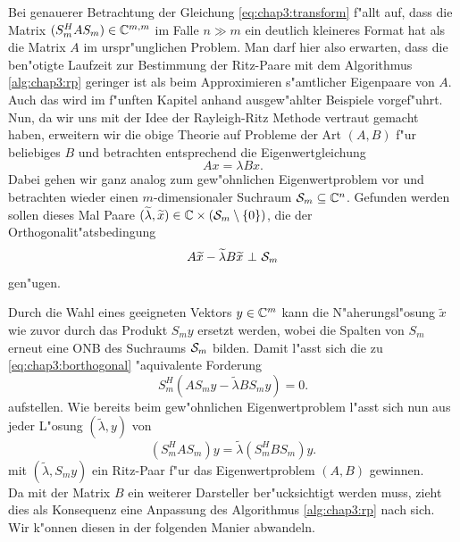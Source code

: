 Bei
genauerer Betrachtung der Gleichung \eqref{eq:chap3:transform} f"allt auf, dass die
Matrix $(S_m^H A S_m) \in \C^{m,m}$ im Falle $n \gg m$ ein deutlich kleineres
Format hat als die Matrix $A$ im urspr"unglichen Problem. Man darf hier also erwarten,
dass die ben"otigte Laufzeit zur Bestimmung der Ritz-Paare mit dem Algorithmus \ref{alg:chap3:rp}
geringer ist als beim Approximieren s"amtlicher Eigenpaare von $A$. Auch das
wird im f"unften Kapitel anhand ausgew"ahlter Beispiele vorgef"uhrt.\\

Nun, da wir uns mit der Idee der Rayleigh-Ritz Methode vertraut gemacht haben, erweitern wir die obige Theorie auf Probleme der Art $(A,B)$ f"ur beliebiges $B$ und betrachten entsprechend die Eigenwertgleichung
\begin{equation}\label{eq:chap3:gevp}
Ax = \lambda Bx.
\end{equation}
Dabei gehen wir ganz analog zum gew"ohnlichen Eigenwertproblem vor und betrachten wieder
einen $m$-dimensionaler Suchraum $\S_m\subseteq \Cn$.
Gefunden werden sollen dieses Mal Paare $ (\widetilde{\lambda}, \widetilde{x}) \in \C
\times (\S_m \setminus\{ 0\})$, die der Orthogonalit"atsbedingung
\begin{equation}\label{eq:chap3:borthogonal}
A\widetilde{x} - \widetilde{\lambda}B\widetilde{x} \ \bot \ \S_m
\end{equation}
gen"ugen.

\newpage

Durch die Wahl eines geeigneten Vektors $y\in\C^m$ kann die N"aherungsl"osung $\widetilde{x}$ wie zuvor durch das Produkt $S_m y$ ersetzt werden, wobei die Spalten von $S_m$ erneut eine ONB des Suchraums $\S_m$ bilden.
Damit l"asst sich die zu \eqref{eq:chap3:borthogonal} "aquivalente Forderung
\[
S_m^H(AS_m y - \widetilde{\lambda} BS_m y) = 0.
\]
aufstellen. Wie bereits beim gew"ohnlichen Eigenwertproblem l"asst sich nun aus jeder L"osung
$(\widetilde{\lambda}, y)$ von
\begin{equation}\label{eq:chap3:transformedevp}
(S_m^H AS_m) y = \widetilde{\lambda} (S_m^H B S_m) y.
\end{equation}
mit $(\widetilde{\lambda}, S_m y)$ ein Ritz-Paar f"ur das Eigenwertproblem $(A,B)$ gewinnen.\\

Da mit der Matrix $B$ ein weiterer Darsteller ber"ucksichtigt werden muss, zieht dies als Konsequenz eine Anpassung des Algorithmus \ref{alg:chap3:rp} nach sich. Wir k"onnen diesen in der folgenden Manier abwandeln.


